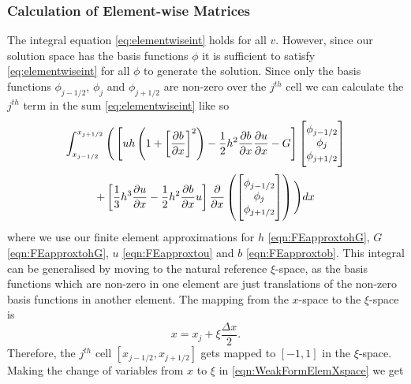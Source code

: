 \subsubsection{Calculation of Element-wise Matrices}
The integral equation \eqref{eq:elementwiseint} holds for all $v$. However, since our solution space has the basis functions $\phi$ it is sufficient to satisfy \eqref{eq:elementwiseint} for all $\phi$ to generate the solution. Since only the basis functions $\phi_{j-1/2}$, $\phi_{j}$ and $\phi_{j+1/2}$ are non-zero over the $j^{th}$ cell we can calculate the $j^{th}$ term in the sum \eqref{eq:elementwiseint} like so
\begin{multline}
\int_{x_{j-1/2} }^{{x_{j+1/2}}} \Bigg(  \left[ uh \left(1  +  \left[\frac{\partial b}{\partial x}\right]^2 \right)  - \frac{1}{2}h^2\frac{\partial b}{\partial x}  \frac{\partial u }{\partial x}  -  G \right] \begin{bmatrix} \TM
\phi_{j-1/2}\\\phi_j \\\phi_{j+1/2} \BM\end{bmatrix}   \\ +  \left[ \frac{1}{3}h^3  \frac{\partial {u}}{\partial x}    -     \frac{1}{2}h^2\frac{\partial b}{\partial x} u    \right] \frac{\partial}{\partial x}\left(\begin{bmatrix} \TM
\phi_{j-1/2}\\\phi_j \\\phi_{j+1/2}  \BM
\end{bmatrix} \right) \Bigg)dx
\label{eqn:WeakFormElemXspace}
\end{multline}
where we use our finite element approximations for $h$ \eqref{eqn:FEapproxtohG}, $G$ \eqref{eqn:FEapproxtohG}, $u$ \eqref{eqn:FEapproxtou} and $b$ \eqref{eqn:FEapproxtob}. This integral can be generalised by moving to the natural reference $\xi$-space, as the basis functions which are non-zero in one element are just translations of the non-zero basis functions in another element. The mapping from the $x$-space to the $\xi$-space is
\begin{equation*}
x = x_j + \xi \frac{\Delta x}{2}.
\end{equation*}
Therefore, the $j^{th}$ cell $\left[x_{j-1/2}, x_{j+1/2}\right]$ gets mapped to $\left[-1,1\right]$ in the $\xi$-space. Making the change of variables from $x$ to $\xi$ in \eqref{eqn:WeakFormElemXspace} we get
